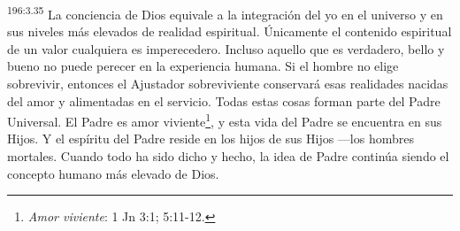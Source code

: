 \par
\textsuperscript{196:3.35} La conciencia de Dios equivale a la integración del yo en el universo y en sus niveles más elevados de realidad espiritual. Únicamente el contenido espiritual de un valor cualquiera es imperecedero. Incluso aquello que es verdadero, bello y bueno no puede perecer en la experiencia humana. Si el hombre no elige sobrevivir, entonces el Ajustador sobreviviente conservará esas realidades nacidas del amor y alimentadas en el servicio. Todas estas cosas forman parte del Padre Universal. El Padre es amor viviente\footnote{\textit{Amor viviente}: 1 Jn 3:1; 5:11-12.}, y esta vida del Padre se encuentra en sus Hijos. Y el espíritu del Padre reside en los hijos de sus Hijos ---los hombres mortales. Cuando todo ha sido dicho y hecho, la idea de Padre continúa siendo el concepto humano más elevado de Dios.